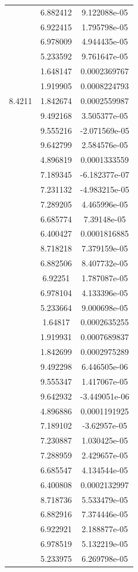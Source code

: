 \begin{table}[t]
\begin{tabular}{c c c  }
 & 6.882412 & 9.122088e-05\\
 & 6.922415 & 1.795798e-05\\
 & 6.978009 & 4.944435e-05\\
\multirow{7}{4em}{8.4211}& 5.233592 & 9.761647e-05\\
 & 1.648147 & 0.0002369767\\
 & 1.919905 & 0.0008224793\\
 & 1.842674 & 0.0002559987\\
 & 9.492168 & 3.505377e-05\\
 & 9.555216 & -2.071569e-05\\
 & 9.642799 & 2.584576e-05\\
 & 4.896819 & 0.0001333559\\
 & 7.189345 & -6.182377e-07\\
 & 7.231132 & -4.983215e-05\\
 & 7.289205 & 4.465996e-05\\
 & 6.685774 & 7.39148e-05\\
 & 6.400427 & 0.0001816885\\
 & 8.718218 & 7.379159e-05\\
 & 6.882506 & 8.407732e-05\\
 & 6.92251 & 1.787087e-05\\
 & 6.978104 & 4.133396e-05\\
 & 5.233664 & 9.000698e-05\\
 & 1.64817 & 0.0002635255\\
 & 1.919931 & 0.0007689837\\
 & 1.842699 & 0.0002975289\\
 & 9.492298 & 6.446505e-06\\
 & 9.555347 & 1.417067e-05\\
 & 9.642932 & -3.449051e-06\\
 & 4.896886 & 0.0001191925\\
 & 7.189102 & -3.62957e-05\\
 & 7.230887 & 1.030425e-05\\
 & 7.288959 & 2.429657e-05\\
 & 6.685547 & 4.134544e-05\\
 & 6.400808 & 0.0002132997\\
 & 8.718736 & 5.533479e-05\\
 & 6.882916 & 7.374446e-05\\
 & 6.922921 & 2.188877e-05\\
 & 6.978519 & 5.132219e-05\\
 & 5.233975 & 6.269798e-05\\

\end{tabular}
\end{table}

